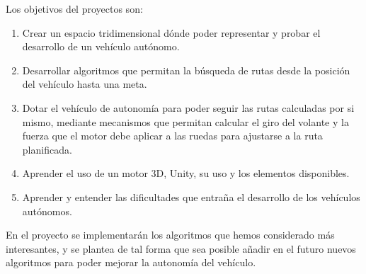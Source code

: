 Los objetivos del proyectos son:

\begin{enumerate}
\item Crear un espacio tridimensional dónde poder representar y probar el desarrollo de un vehículo autónomo.
\item Desarrollar algoritmos que permitan la búsqueda de rutas desde la posición del vehículo hasta una meta.
\item Dotar el vehículo de autonomía para poder seguir las rutas calculadas por si mismo, mediante mecanismos que permitan calcular el giro del volante y la fuerza que el motor debe aplicar a las ruedas para ajustarse a la ruta planificada.
\item Aprender el uso de un motor 3D, Unity, su uso y los elementos disponibles.
\item Aprender y entender las dificultades que entraña el desarrollo de los vehículos autónomos.
\end{enumerate}

En el proyecto se implementarán los algoritmos que hemos considerado más interesantes, y se plantea de tal forma que sea posible añadir en el futuro nuevos algoritmos para poder mejorar la autonomía del vehículo.
